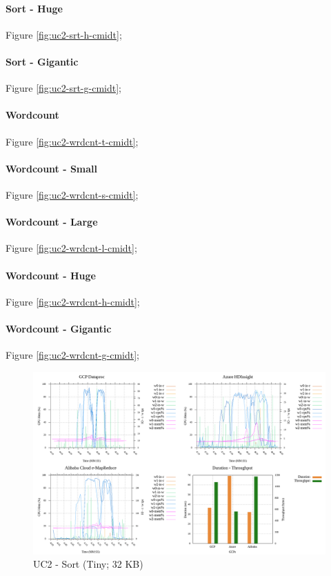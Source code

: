 \documentclass[review]{elsarticle}
\begin{document}
\paragraph{Sort - Huge} Figure \ref{fig:uc2-srt-h-cmidt}; 
\paragraph{Sort - Gigantic} Figure \ref{fig:uc2-srt-g-cmidt}; 

\paragraph{Wordcount} Figure \ref{fig:uc2-wrdcnt-t-cmidt}; 
\paragraph{Wordcount - Small} Figure \ref{fig:uc2-wrdcnt-s-cmidt}; 
\paragraph{Wordcount - Large} Figure \ref{fig:uc2-wrdcnt-l-cmidt}; 
\paragraph{Wordcount - Huge} Figure \ref{fig:uc2-wrdcnt-h-cmidt}; 
\paragraph{Wordcount - Gigantic} Figure \ref{fig:uc2-wrdcnt-g-cmidt}; 


\begin{figure}[p]
	\includegraphics[width=\textwidth]{uc2-srt-t-cmidt}
	\caption{UC2 - Sort (Tiny; 32 KB)}
	\label{fig:uc2-srt-t-cmidt}
	\centering
\end{figure}
\end{document}
